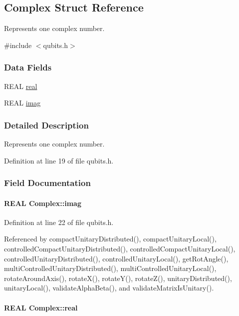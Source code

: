 \hypertarget{structComplex}{
\subsection{Complex Struct Reference}
\label{structComplex}
}


Represents one complex number.  


{\ttfamily \#include $<$qubits.h$>$}\subsubsection*{Data Fields}
\begin{DoxyCompactItemize}
\item 
REAL \hyperlink{structComplex_a479ad939835457595fcca3ca55c06283}{real}
\item 
REAL \hyperlink{structComplex_a1151948284b21c0052f203f23ab931d9}{imag}
\end{DoxyCompactItemize}


\subsubsection{Detailed Description}
Represents one complex number. 

Definition at line 19 of file qubits.h.

\subsubsection{Field Documentation}
\hypertarget{structComplex_a1151948284b21c0052f203f23ab931d9}{
\paragraph[{imag}]{\setlength{\rightskip}{0pt plus 5cm}REAL {\bf Complex::imag}}\hfill}
\label{structComplex_a1151948284b21c0052f203f23ab931d9}


Definition at line 22 of file qubits.h.

Referenced by compactUnitaryDistributed(), compactUnitaryLocal(), controlledCompactUnitaryDistributed(), controlledCompactUnitaryLocal(), controlledUnitaryDistributed(), controlledUnitaryLocal(), getRotAngle(), multiControlledUnitaryDistributed(), multiControlledUnitaryLocal(), rotateAroundAxis(), rotateX(), rotateY(), rotateZ(), unitaryDistributed(), unitaryLocal(), validateAlphaBeta(), and validateMatrixIsUnitary().\hypertarget{structComplex_a479ad939835457595fcca3ca55c06283}{
\paragraph[{real}]{\setlength{\rightskip}{0pt plus 5cm}REAL {\bf Complex::real}}\hfill}
\label{structComplex_a479ad939835457595fcca3ca55c06283}


